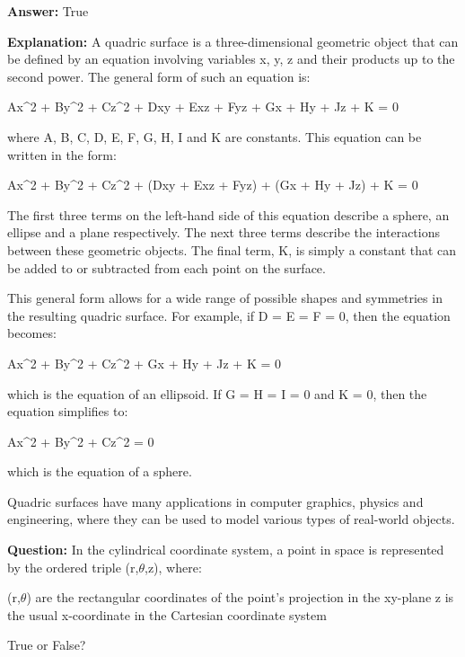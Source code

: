 \documentclass{article}
\begin{document}
                \textbf{Answer:} True

                \textbf{Explanation:} A quadric surface is a three-dimensional geometric object that can be defined by an equation involving variables x, y, z and their products up to the second power. The general form of such an equation is:

Ax{\textasciicircum}2 + By{\textasciicircum}2 + Cz{\textasciicircum}2 + Dxy + Exz + Fyz + Gx + Hy + Jz + K = 0

where A, B, C, D, E, F, G, H, I and K are constants. This equation can be written in the form:

Ax{\textasciicircum}2 + By{\textasciicircum}2 + Cz{\textasciicircum}2 + (Dxy + Exz + Fyz) + (Gx + Hy + Jz) + K = 0

The first three terms on the left-hand side of this equation describe a sphere, an ellipse and a plane respectively. The next three terms describe the interactions between these geometric objects. The final term, K, is simply a constant that can be added to or subtracted from each point on the surface.

This general form allows for a wide range of possible shapes and symmetries in the resulting quadric surface. For example, if D = E = F = 0, then the equation becomes:

Ax{\textasciicircum}2 + By{\textasciicircum}2 + Cz{\textasciicircum}2 + Gx + Hy + Jz + K = 0

which is the equation of an ellipsoid. If G = H = I = 0 and K = 0, then the equation simplifies to:

Ax{\textasciicircum}2 + By{\textasciicircum}2 + Cz{\textasciicircum}2 = 0

which is the equation of a sphere.

Quadric surfaces have many applications in computer graphics, physics and engineering, where they can be used to model various types of real-world objects.
                
                \vspace{0.5cm} 
        
            
                \textbf {Question:} In the cylindrical coordinate system, a point in space is represented by the ordered triple (r,\ensuremath{\theta},z), where:

(r,\ensuremath{\theta}) are the rectangular coordinates of the point's projection in the xy-plane
z is the usual x-coordinate in the Cartesian coordinate system

True or False?
                
\end{document}
